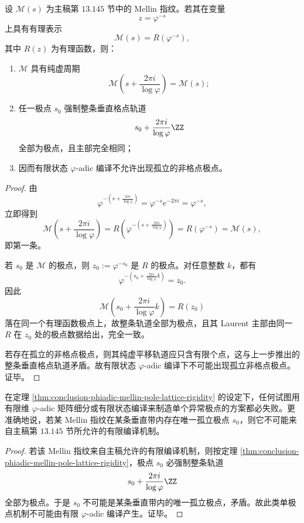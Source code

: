 \begin{theorem}\label{thm:conclusion-phiadic-mellin-pole-lattice-rigidity}
设 \(\mathcal M(s)\) 为主稿第 \(13.145\) 节中的 Mellin 指纹。若其在变量
\[
z=\varphi^{-s}
\]
上具有有理表示
\[
\mathcal M(s)=R(\varphi^{-s}),
\]
其中 \(R(z)\) 为有理函数，则：
\begin{enumerate}
  \item \(\mathcal M\) 具有纯虚周期
  \[
  \mathcal M\!\left(s+\frac{2\pi i}{\log\varphi}\right)=\mathcal M(s);
  \]
  \item 任一极点 \(s_0\) 强制整条垂直格点轨道
  \[
  s_0+\frac{2\pi i}{\log\varphi}\ZZ
  \]
  全部为极点，且主部完全相同；
  \item 因而有限状态 \(\varphi\)-adic 编译不允许出现孤立的非格点极点。
\end{enumerate}
\end{theorem}
\begin{proof}
由
\[
\varphi^{-(s+\frac{2\pi i}{\log\varphi})}
=
\varphi^{-s}e^{-2\pi i}
=
\varphi^{-s},
\]
立即得到
\[
\mathcal M\!\left(s+\frac{2\pi i}{\log\varphi}\right)
=
R\!\left(\varphi^{-(s+\frac{2\pi i}{\log\varphi})}\right)
=
R(\varphi^{-s})
=
\mathcal M(s),
\]
即第一条。

若 \(s_0\) 是 \(\mathcal M\) 的极点，则 \(z_0:=\varphi^{-s_0}\) 是 \(R\) 的极点。对任意整数 \(k\)，都有
\[
\varphi^{-(s_0+\frac{2\pi i}{\log\varphi}k)}=z_0.
\]
因此
\[
\mathcal M\!\left(s_0+\frac{2\pi i}{\log\varphi}k\right)=R(z_0)
\]
落在同一个有理函数极点上，故整条轨道全部为极点，且其 Laurent 主部由同一 \(R\) 在 \(z_0\) 处的极点数据给出，完全一致。

若存在孤立的非格点极点，则其纯虚平移轨道应只含有限个点，这与上一步推出的整条垂直格点轨道矛盾。故有限状态 \(\varphi\)-adic 编译下不可能出现孤立非格点极点。证毕。
\end{proof}

\begin{corollary}\label{cor:conclusion-phiadic-finite-compile-no-isolated-pole}
在定理 \ref{thm:conclusion-phiadic-mellin-pole-lattice-rigidity} 的设定下，任何试图用有限维 \(\varphi\)-adic 矩阵细分或有限状态编译来制造单个异常极点的方案都必失败。更准确地说，若某 Mellin 指纹在某条垂直带内存在唯一孤立极点 \(s_0\)，则它不可能来自主稿第 \(13.145\) 节所允许的有限编译机制。
\end{corollary}
\begin{proof}
若该 Mellin 指纹来自主稿允许的有限编译机制，则按定理 \ref{thm:conclusion-phiadic-mellin-pole-lattice-rigidity}，极点 \(s_0\) 必强制整条轨道
\[
s_0+\frac{2\pi i}{\log\varphi}\ZZ
\]
全部为极点。于是 \(s_0\) 不可能是某条垂直带内的唯一孤立极点，矛盾。故此类单极点机制不可能由有限 \(\varphi\)-adic 编译产生。证毕。
\end{proof}
